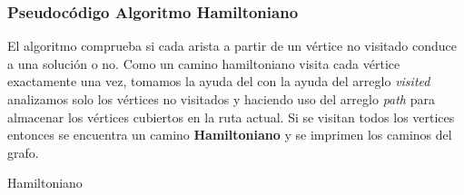     \subsubsection{Pseudocódigo Algoritmo Hamiltoniano}
    El algoritmo comprueba si cada arista a partir de un vértice no visitado conduce a una solución o no. Como un camino hamiltoniano visita cada vértice exactamente una vez, tomamos la ayuda del con la ayuda del arreglo \textit{visited} analizamos solo los vértices no visitados y haciendo uso del arreglo \textit{path} para almacenar los vértices cubiertos en la ruta actual. Si se visitan todos los vertices entonces se encuentra un camino \textbf{Hamiltoniano} y se imprimen los caminos del grafo.
        \begin{algorithm}
            \caption{Hamiltoniano
            }\label{alg:two}

                        

            
        \end{algorithm}
        
        
        
        